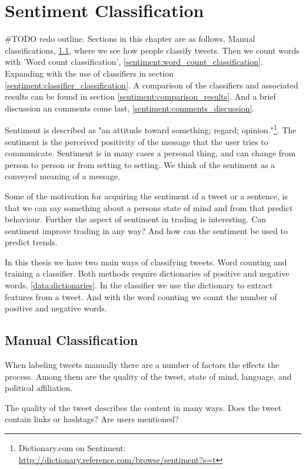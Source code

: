 \chapter{Sentiment Classification}\label{sentiment}

#TODO redo outline. 
Sections in this chapter are as follows. Manual classifications,
\ref{sentiment:manual_classification}, where we see how people classify
tweets. Then we count words with 'Word count classification',
\ref{sentiment:word_count_classification}. Expanding with the use of
classifiers in section \ref{sentiment:classifier_classification}. A
comparison of the classifiers and associated results can be found in section
\ref{sentiment:comparison_results}. And a brief discussion an comments come
last, \ref{sentiment:comments_discussion}.

Sentiment is described as "an attitude toward something; regard;
opinion."\footnote{ Dictionary.com on Sentiment:
\url{http://dictionary.reference.com/browse/sentiment?s=t}}. The sentiment is the perceived positivity of the message that the user tries to
communicate. Sentiment is in many cases a personal thing, and can change from
person to person or from setting to setting. We think of the sentiment as a
conveyed meaning of a message. 

Some of the motivation for acquiring the sentiment of a tweet or a sentence, is
that we can say something about a persons state of mind and from that predict
behaviour. Further the aspect of sentiment in trading is interesting. Can
sentiment improve trading in any way? And how can the sentiment be used to
predict trends.

In this thesis we have two main ways of classifying tweets. Word counting and
training a classifier. Both methods require dictionaries of positive and
negative words, \ref{data:dictionaries}. In the classifier we use the dictionary
to extract features from a tweet. And with the word counting we count the
number of positive and negative words. 

\section{Manual Classification}\label{sentiment:manual_classification}
When labeling tweets manually there are a number of factors the effects the
process. Among them are the quality of the tweet, state of mind, language, and
political affiliation.

The quality of the tweet describes the content in many ways. Does the tweet
contain links or hashtags? Are users mentioned?

